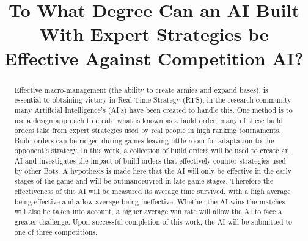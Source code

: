 \documentclass[journal]{IEEEtran}
\begin{document}
%
\title{%
	To What Degree Can an AI Built With Expert Strategies be Effective Against Competition AI?} %

%
%
\author{
}


\maketitle

\begin{abstract}
Effective macro-management (the ability to create armies and expand bases), is essential to obtaining victory in Real-Time Strategy (RTS), in the research community many Artificial Intelligence's (AI's) have been created to handle this. One method is to use a design approach to create what is known as a build order, many of these build orders take from expert strategies used by real people in high ranking tournaments. Build orders can be ridged during games leaving little room for adaptation to the opponent's strategy. In this work, a collection of build orders will be used to create an AI and investigates the impact of build orders that effectively counter strategies used by other Bots. A hypothesis is made here that the AI will only be effective in the early stages of the game and will be outmanoeuvred in late-game stages. Therefore the effectiveness of this AI will be measured its average time survived, with a high average being effective and a low average being ineffective. Whether the AI wins the matches will also be taken into account, a higher average win rate will allow the AI to face a greater challenge. Upon successful completion of this work, the AI will be submitted to one of three competitions.
\end{abstract}
\end{document}
